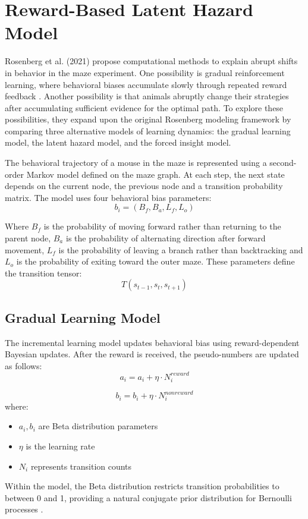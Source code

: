 \section{Reward-Based Latent Hazard Model}

Rosenberg et al. (2021) propose computational methods to explain abrupt shifts in behavior in the maze experiment. One possibility is gradual reinforcement learning, where behavioral biases accumulate slowly through repeated reward feedback \cite{sutton2018}. Another possibility is that animals abruptly change their strategies after accumulating sufficient evidence for the optimal path. To explore these possibilities, they expand upon the original Rosenberg modeling framework by comparing three alternative models of learning dynamics: the gradual learning model, the latent hazard model, and the forced insight model.

The behavioral trajectory of a mouse in the maze is represented using a second-order Markov model defined on the maze graph. At each step, the next state depends on the current node, the previous node and a transition probability matrix. The model uses four behavioral bias parameters:
\begin{equation}
b_i = (B_f, B_a, L_f, L_o)
\end{equation}

Where $B_f$ is the probability of moving forward rather than returning to the parent node, $B_a$ is the probability of alternating direction after forward movement, $L_f$ is the probability of leaving a branch rather than backtracking and $L_o$ is the probability of exiting toward the outer maze. These parameters define the transition tensor:
\begin{equation}
T(s_{t-1}, s_t , s_{t+1})
\end{equation}

\subsection{Gradual Learning Model}
The incremental learning model updates behavioral bias using reward-dependent Bayesian updates. After the reward is received, the pseudo-numbers are updated as follows:
\begin{equation}
a_i = a_i + \eta \cdot N_i^{reward}
\end{equation}

\begin{equation}
 b_i = b_i + \eta 
\cdot N_i^{nonreward}
\end{equation}
where:
\begin{itemize}
    \item $a_i, b_i$ are Beta distribution parameters
    \item $\eta$ is the learning rate
    \item $N_i$ represents transition counts
\end{itemize}
Within the model, the Beta distribution restricts transition probabilities to between 0 and 1, providing a natural conjugate prior distribution for Bernoulli processes \cite{bishop2006}.

